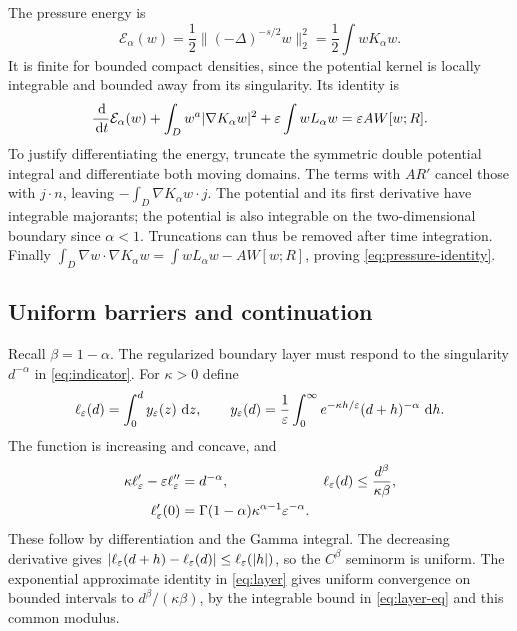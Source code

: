 The pressure energy is
\[
 \mathcal E_\alpha(w)=\frac12\|(-\Delta)^{-s/2}w\|_2^2
 =\frac12\int wK_\alpha w.
\]
It is finite for bounded compact densities, since the potential kernel is
locally integrable and bounded away from its singularity. Its identity is
\begin{equation}\label{eq:pressure-identity}
 \frac{\,\mathrm d}{\,\mathrm d t}\mathcal E_\alpha(w)
 +\int_Dw^a|\nabla K_\alpha w|^2
 +\varepsilon\int wL_\alpha w=\varepsilon A W[w;R].
\end{equation}
To justify differentiating the energy, truncate the symmetric double
potential integral and differentiate both moving domains. The terms with
$AR'$ cancel those with $j\cdot n$, leaving
$-\int_D\nabla K_\alpha w\cdot j$.
The potential and its first derivative have integrable majorants;
the potential is also integrable on the two-dimensional boundary since
$\alpha<1$. Truncations can thus be removed after time integration.
Finally
$\int_D\nabla w\cdot\nabla K_\alpha w
=\int wL_\alpha w-AW[w;R]$, proving
\eqref{eq:pressure-identity}.

\subsection{Uniform barriers and continuation}

Recall $\beta=1-\alpha$. The regularized boundary layer must respond to the singularity
$d^{-\alpha}$ in \eqref{eq:indicator}. For $\kappa>0$ define
\begin{equation}\label{eq:layer}
 \ell_\varepsilon(d)=\int_0^d y_\varepsilon(z)\,\,\mathrm d z,
 \qquad y_\varepsilon(d)=\frac1{\varepsilon}\int_0^\infty
 e^{-\kappa h/\varepsilon}(d+h)^{-\alpha}\,\,\mathrm d h.
\end{equation}
The function is increasing and concave, and
\begin{align}
 \kappa\ell_\varepsilon'-\varepsilon\ell_\varepsilon''&=d^{-\alpha},
 &\ell_\varepsilon(d)&\leq\frac{d^\beta}{\kappa\beta},\label{eq:layer-eq}\\
 \ell_\varepsilon'(0)&=\Gamma(1-\alpha)\kappa^{\alpha-1}\varepsilon^{-\alpha}.
                                                        \label{eq:layer-slope}
\end{align}
These follow by differentiation and the Gamma integral. The decreasing
derivative gives
$|\ell_\varepsilon(d+h)-\ell_\varepsilon(d)|\leq\ell_\varepsilon(|h|)$,
so the $C^\beta$ seminorm is uniform. The exponential approximate identity
in \eqref{eq:layer} gives uniform convergence on bounded intervals to
$d^\beta/(\kappa\beta)$, by the integrable bound in
\eqref{eq:layer-eq} and this common modulus.

